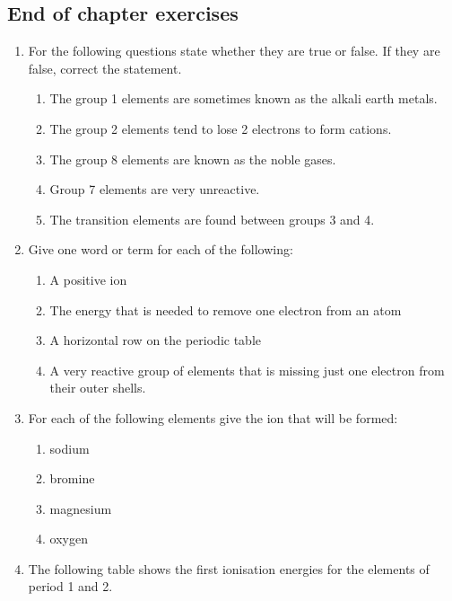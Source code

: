             \subsection{ End of chapter exercises}
            \nopagebreak
            \label{m38757*uid091221}\begin{enumerate}[noitemsep, label=\textbf{\arabic*}. ] 
            \item For the following questions state whether they are true or false. If they are false, correct the statement. \label{m38757*id073324}\begin{enumerate}[noitemsep, label=\textbf{\alph*}. ] 
            \item The group 1 elements are sometimes known as the alkali earth metals.
\item The group 2 elements tend to lose 2 electrons to form cations.
\item The group 8 elements are known as the noble gases.\item Group 7 elements are very unreactive.\item The transition elements are found between groups 3 and 4.\end{enumerate}
\item Give one word or term for each of the following:
\label{m38757*id0734}\begin{enumerate}[noitemsep, label=\textbf{\alph*}. ] 
            \item A positive ion
\item The energy that is needed to remove one electron from an atom\item A horizontal row on the periodic table\item A very reactive group of elements that is missing just one electron from their outer shells.\end{enumerate}
\item For each of the following elements give the ion that will be formed:
\label{m38757*id07324}\begin{enumerate}[noitemsep, label=\textbf{\alph*}. ] 
            \item sodium
\item bromine
\item magnesium
\item oxygen
\end{enumerate}
\label{m38757*uid222}\item The following table shows the first ionisation energies for the elements of period 1 and 2.

\end{enumerate}
